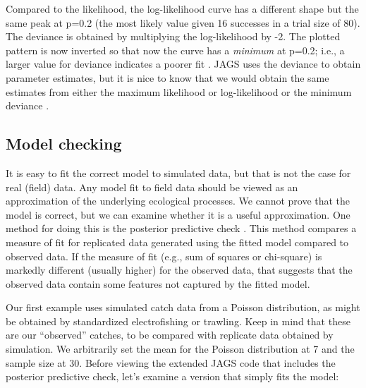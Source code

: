 \documentclass[
]{krantz}
\begin{document}
Compared to the likelihood, the log-likelihood curve has a different shape but the same peak at p=0.2 (the most likely value given 16 successes in a trial size of 80). The deviance is obtained by multiplying the log-likelihood by -2. The plotted pattern is now inverted so that now the curve has a \emph{minimum} at p=0.2; i.e., a larger value for deviance indicates a poorer fit \citep{mccarthy2007}. JAGS uses the deviance to obtain parameter estimates, but it is nice to know that we would obtain the same estimates from either the maximum likelihood or log-likelihood or the minimum deviance \citep{mccarthy2007}.

\hypertarget{Model-checking}{%
\subsection{Model checking}\label{Model-checking}}

It is easy to fit the correct model to simulated data, but that is not the case for real (field) data. Any model fit to field data should be viewed as an approximation of the underlying ecological processes. We cannot prove that the model is correct, but we can examine whether it is a useful approximation. One method for doing this is the posterior predictive check \citep{kéry_2010, kéry.schaub_2011, gelman.etal_2013, conn.etal_2018}. This method compares a measure of fit for replicated data generated using the fitted model compared to observed data. If the measure of fit (e.g., sum of squares or chi-square) is markedly different (usually higher) for the observed data, that suggests that the observed data contain some features not captured by the fitted model.

Our first example uses simulated catch data from a Poisson distribution, as might be obtained by standardized electrofishing or trawling. Keep in mind that these are our ``observed'' catches, to be compared with replicate data obtained by simulation. We arbitrarily set the mean for the Poisson distribution at 7 and the sample size at 30. Before viewing the extended JAGS code that includes the posterior predictive check, let's examine a version that simply fits the model:
\end{document}
